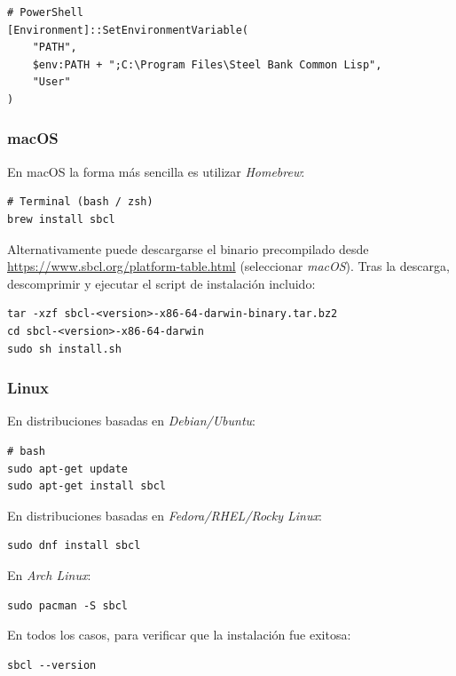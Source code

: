 \documentclass[12pt,a4paper]{article}
\begin{document}
\begin{lstlisting}[style=shell]
# PowerShell
[Environment]::SetEnvironmentVariable(
    "PATH",
    $env:PATH + ";C:\Program Files\Steel Bank Common Lisp",
    "User"
)
\end{lstlisting}

\subsubsection*{macOS}

En macOS la forma más sencilla es utilizar \textit{Homebrew}:

\begin{lstlisting}[style=shell]
# Terminal (bash / zsh)
brew install sbcl
\end{lstlisting}

Alternativamente puede descargarse el binario precompilado desde
\url{https://www.sbcl.org/platform-table.html} (seleccionar \textit{macOS}).
Tras la descarga, descomprimir y ejecutar el script de instalación
incluido:

\begin{lstlisting}[style=shell]
tar -xzf sbcl-<version>-x86-64-darwin-binary.tar.bz2
cd sbcl-<version>-x86-64-darwin
sudo sh install.sh
\end{lstlisting}

\subsubsection*{Linux}

En distribuciones basadas en \textit{Debian/Ubuntu}:

\begin{lstlisting}[style=shell]
# bash
sudo apt-get update
sudo apt-get install sbcl
\end{lstlisting}

En distribuciones basadas en \textit{Fedora/RHEL/Rocky Linux}:

\begin{lstlisting}[style=shell]
sudo dnf install sbcl
\end{lstlisting}

En \textit{Arch Linux}:

\begin{lstlisting}[style=shell]
sudo pacman -S sbcl
\end{lstlisting}

En todos los casos, para verificar que la instalación fue exitosa:

\begin{lstlisting}[style=shell]
sbcl --version
\end{lstlisting}
\end{document}
